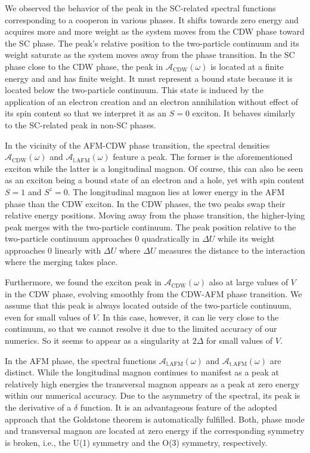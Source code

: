 \documentclass[
    reprint, 
    aps,
    preprintnumbers,
    twocolumn,
    prb,
    superscriptaddress
]{revtex4-2}
\newcommand{\spectral}[1]{\mathcal{A}_\text{#1}  (\omega)}
\begin{document}
We observed the behavior of the peak in the SC-related spectral functions corresponding to a cooperon in various phases. 
It shifts towards zero energy and acquires more and more weight as the system moves from the CDW phase toward the SC phase. 
The peak's relative position to the two-particle continuum and its weight saturate 
as the system moves away from the phase transition.
In the SC phase close to the CDW phase, the peak in $\spectral{CDW}$ 
is located at a finite energy and and has finite weight. 
It must represent a bound state because it is located below the two-particle continuum. 
This state is induced by the application of an electron creation and an electron annihilation without effect of its spin content so that we interpret it as an $S=0$ exciton.
It behaves similarly to the SC-related peak in non-SC phases.

In the vicinity of the AFM-CDW phase transition, the spectral densities
$\spectral{CDW}$ and $\spectral{l.AFM}$ feature a peak. 
The former is the aforementioned exciton while the latter is a longitudinal magnon. 
Of course, this can also be seen as an exciton being a bound
state of an electron and a hole, yet with spin content $S=1$ and $S^z=0$. 
The longitudinal magnon lies at lower energy in the AFM phase than the CDW exciton. 
In the CDW phases, the two peaks swap their relative energy positions. 
Moving away from the phase transition, the higher-lying peak merges with the two-particle continuum. 
The peak position relative to the two-particle continuum approaches $0$ 
quadratically in $\Delta U$ while its weight approaches $0$ linearly with $\Delta U$ where
$\Delta U$ measures the distance to the interaction where the merging takes place.

Furthermore, we found the exciton peak in $\spectral{CDW}$ also at large values of $V$ in the CDW phase, 
evolving smoothly from the CDW-AFM phase transition. 
We assume that this peak is always located outside of the two-particle continuum, even for small values of $V$.
In this case, however, it can lie very close to the continuum, so that we cannot resolve it due to the limited accuracy of our numerics.
So it seems to appear as a singularity at $2\Delta$ for small values of $V$.

In the AFM phase, the spectral functions $\spectral{l.AFM}$ and $\spectral{t.AFM}$ are distinct.
While the longitudinal magnon continues to manifest as a peak at relatively high energies
the transversal magnon appears as a peak at zero energy within our numerical accuracy. Due to
the asymmetry of the spectral, its peak is the derivative of a $\delta$ function.
It is an advantageous feature of the adopted approach that the Goldstone theorem is 
automatically fulfilled. Both, phase mode and transversal magnon are located at zero energy
if the corresponding symmetry is broken, i.e., the U(1) symmetry and the O(3) symmetry,
respectively.
\end{document}
